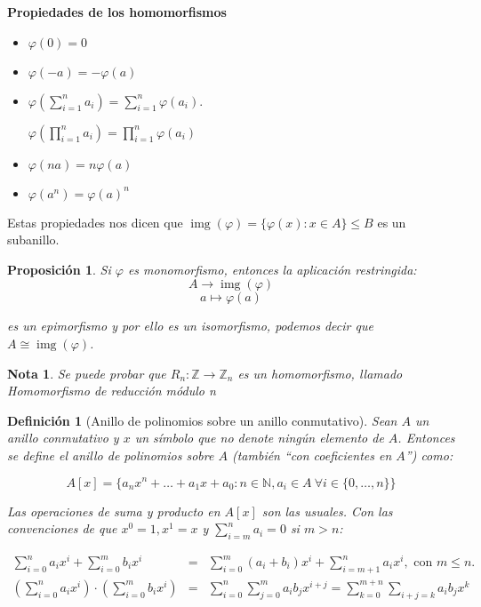\documentclass[11pt, a4paper, titlepage]{article}
\newif\IfInSansMode
\providecommand{\ent}{\mathbb{Z}}
\DeclareMathOperator*{\img}{img}
\theoremstyle{theorem-style}
\newtheorem{nprop}{Proposición}[section]
\theoremstyle{definition-style}
\newtheorem{ndef}{Definición}[section]
\theoremstyle{remark-style}
\newtheorem*{nota}{Nota}
\theoremstyle{example-style}
\begin{document}
\textbf{Propiedades de los homomorfismos}

\begin{itemize}

\item $\varphi(0) = 0$

\item $\varphi(-a) = -\varphi(a) $

\item $\varphi(\sum_{i = 1}^n a_i) = \sum_{i = 1}^n\varphi(a_i)$.

$\varphi(\prod_{i = 1}^n a_i) = \prod_{i = 1}^n\varphi(a_i)$

\item $\varphi(na) = n\varphi(a)$

\item $\varphi(a^n) = \varphi(a)^n$

\end{itemize}


Estas propiedades nos dicen que $\img(\varphi) = \{ \varphi(x): x \in A\} \leq B$ es un subanillo.

\begin{nprop}
	Si $\varphi$ es monomorfismo, entonces la aplicación restringida:
\[
A \to \img(\varphi)\]
\[
a \mapsto \varphi(a)
\]

es un epimorfismo y por ello es un isomorfismo, podemos decir que $A \cong \img(\varphi)$.\\
\end{nprop}


\begin{nota}
	Se puede probar que $R_n: \ent \to \ent_n$ es un homomorfismo, llamado \emph{Homomorfismo de reducción módulo n}\\
\end{nota}

\begin{ndef}[Anillo de polinomios sobre un anillo conmutativo]
  Sean $A$ un anillo conmutativo y $x$ un símbolo que no denote ningún elemento de $A$. Entonces se define el anillo de polinomios sobre $A$ (también ``con coeficientes en $A$'') como:

  \[
       A[x] = \{ a_nx^n + \dots + a_1x + a_0 : n \in \mathbb{N}, a_i \in A \ \forall i \in \{0, \dots, n\} \}
  \]

  Las operaciones de suma y producto en $A[x]$ son las usuales. Con las convenciones de que $x^0 = 1, x^1 = x$ y $\sum_{i=m}^n a_i = 0$ si $m>n$:

  \[
  \begin{array}{lllll}
    \sum_{i=0}^n a_ix^i + \sum_{i=0}^m b_ix^i & = & \sum_{i=0}^m (a_i + b_i)x^i + \sum_{i=m+1}^n a_ix^i, \text{ con $m \le n$.} & & \\
    \left(\sum_{i=0}^n a_ix^i\right) \cdot \left(\sum_{i=0}^m b_ix^i\right) & = & \sum_{i=0}^n \sum_{j=0}^m a_i b_j x^{i+j} =  \sum_{k=0}^{m+n} \sum_{i+j=k} a_ib_j x^k
  \end{array}
  \]

\end{ndef}
\end{document}
